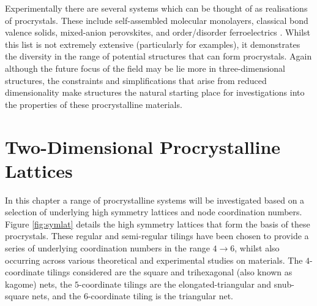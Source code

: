 Experimentally there are several systems which can be thought of as realisations of procrystals. 
These include self-assembled molecular monolayers, classical bond valence solids, mixed-anion perovskites, and order/disorder ferroelectrics \cite{Blunt2008,Anderson1973,Camp2012,Comes1968}.
Whilst this list is not extremely extensive (particularly for \td{} examples), it demonstrates the diversity in the range of potential structures that can form procrystals.
Again although the future focus of the field may be lie more in three\--dimensional structures, the constraints and simplifications that arise from reduced dimensionality make \td{} structures the natural starting place for investigations into the properties of these procrystalline materials.

\section{Two\--Dimensional Procrystalline Lattices}

In this chapter a range of \td{} procrystalline systems will be investigated based on a selection of underlying high symmetry lattices and node coordination numbers.
Figure \ref{fig:symlat} details the high symmetry lattices that form the basis of these procrystals.
These regular and semi\--regular tilings have been chosen to provide a series of underlying coordination numbers in the range $4\rightarrow6$, whilst also occurring across various theoretical and experimental studies on \td{} materials.
The $4$\--coordinate tilings considered are the square \cite{Algara-Siller2015,Zhu2017,Hibble2011} and trihexagonal (also known as kagome) \cite{Zheng2014,Postulka2016,Chen2011} nets,
the $5$\--coordinate tilings are the elongated\--triangular \cite{Griffith2018} and snub\--square \cite{Urgel2014,Kryuchkov2018,Song2015,Pineros2016} nets, and the $6$\--coordinate tiling is the triangular net. 

